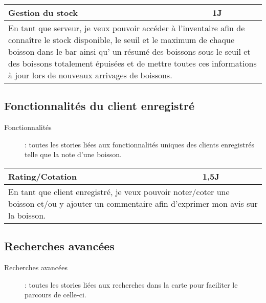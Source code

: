 \begin{center}
	\vspace{1cm}
	
	\begin{tabular}{ll}
		\hline
			\multicolumn{1}{|p{14cm}|}{Gestion du stock} & \multicolumn{1}{p{0.7cm}|}{1J}\\ 
		\hline
			\multicolumn{2}{|p{15cm}|}{En tant que serveur, je veux pouvoir accéder à l'inventaire
			afin de connaître le stock disponible, le seuil et le maximum de chaque boisson dans
			le bar ainsi qu' un résumé des boissons sous le seuil et des boissons totalement
			épuisées et de mettre toutes ces informations à jour lors de nouveaux arrivages de boissons.} \\
		\hline
	\end{tabular}
\end{center}

\subsection{Fonctionnalités du client enregistré}
\begin{description}
	\item[Fonctionnalités] : toutes les stories liées aux fonctionnalités uniques des clients enregistrés telle que la note d'une boisson.
\end{description}

\begin{center}
	\begin{tabular}{ll}
		\hline
			\multicolumn{1}{|p{14cm}|}{Rating/Cotation} & \multicolumn{1}{p{0.7cm}|}{1,5J} \\ 
		\hline
			\multicolumn{2}{|p{15cm}|}{En tant que client enregistré, je veux pouvoir
			noter/coter une boisson et/ou y ajouter un commentaire afin d'exprimer mon avis sur la boisson.} \\
		\hline
	\end{tabular}
\end{center}

\subsection{Recherches avancées}
\begin{description}
	\item[Recherches avancées] : toutes les stories liées aux recherches dans la carte pour faciliter le parcours de celle-ci.
\end{description}

